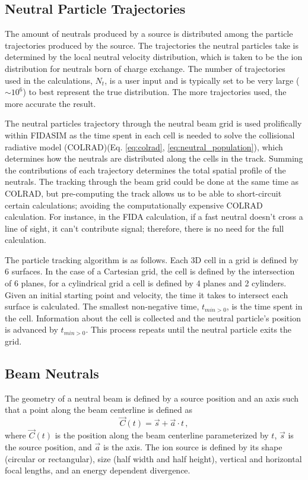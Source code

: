\subsection{Neutral Particle Trajectories}
The amount of neutrals produced by a source is distributed among the particle trajectories produced by the source. The trajectories the neutral particles take is determined by the local neutral velocity distribution, which is taken to be the ion distribution for neutrals born of charge exchange. The number of trajectories used in the calculations, $N_t$, is a user input and is typically set to be very large ($\sim10^6$) to best represent the true distribution. The more trajectories used, the more accurate the result.

The neutral particles trajectory through the neutral beam grid is used prolifically within FIDASIM as the time spent in each cell is needed to solve the collisional radiative model (COLRAD)(Eq. \ref{eq:colrad}, \ref{eq:neutral_population}), which determines how the neutrals are distributed along the cells in the track. Summing the contributions of each trajectory determines the total spatial profile of the neutrals. The tracking through the beam grid could be done at the same time as COLRAD, but pre-computing the track allows us to be able to short-circuit certain calculations; avoiding the computationally expensive COLRAD calculation. For instance, in the FIDA calculation, if a fast neutral doesn't cross a line of sight, it can't contribute signal; therefore, there is no need for the full calculation.

The particle tracking algorithm is as follows.
Each 3D cell in a grid is defined by 6 surfaces. In the case of a Cartesian grid, the cell is defined by the intersection of 6 planes, for a cylindrical grid a cell is defined by 4 planes and 2 cylinders. Given an initial starting point and velocity, the time it takes to intersect each surface is calculated. The smallest non-negative time, $t_{min>0}$, is the time spent in the cell. Information about the cell is collected and the neutral particle's position is advanced by $t_{min>0}$. This process repeats until the neutral particle exits the grid.

\subsection{Beam Neutrals}
The geometry of a neutral beam is defined by a source position and an axis such that a point along the beam centerline is defined as
\begin{equation}\label{eq:nbi_geom}
    \vec{C}(t) = \vec{s} + \vec{a} \cdot t\,,
\end{equation}
where $\vec{C}(t)$ is the position along the beam centerline parameterized by $t$, $\vec{s}$ is the source position, and $\vec{a}$ is the axis. The ion source is defined by its shape (circular or rectangular), size (half width and half height), vertical and horizontal focal lengths, and an energy dependent divergence. 

